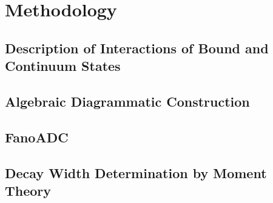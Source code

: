 \chapter{Methodology}
\section{Description of Interactions of Bound and Continuum States}
\section{Algebraic Diagrammatic Construction}
\section{FanoADC}
\section{Decay Width Determination by Moment Theory}
 
